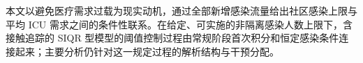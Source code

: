 本文以避免医疗需求过载为现实动机，通过全部新增感染流量给出社区感染上限与平均 ICU 需求之间的条件性联系。在给定、可实施的非隔离感染人数上限下，含接触追踪的 SIQR 型模型的阈值控制过程由常规阶段首次积分和恒定感染条件连接起来；主要分析仍针对这一规定过程的解析结构与干预分配。
